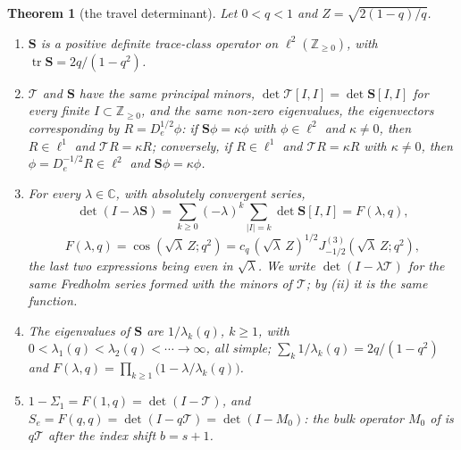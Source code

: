 \documentclass[11pt]{article}
\theoremstyle{plain}
\newtheorem{theorem}{Theorem}
\theoremstyle{definition}
\theoremstyle{remark}
\newcommand{\Z}{\mathbb{Z}}
\newcommand{\C}{\mathbb{C}}
\theoremstyle{plain}\newtheorem*{maintheorem}{Main Theorem}
\begin{document}
\begin{theorem}[the travel determinant]\label{thm:fredholm}
Let $0<q<1$ and $Z=\sqrt{2(1-q)/q}$.
\begin{enumerate}[label=\textup{(\roman*)},leftmargin=2.2em,itemsep=0.1em,topsep=0.2em]
\item $\mathbf S$ is a positive definite trace-class operator on $\ell^2(\Z_{\ge0})$, with
$\operatorname{tr}\mathbf S=2q/(1-q^2)$.
\item $\mathcal T$ and $\mathbf S$ have the same principal minors,
$\det\mathcal T[I,I]=\det\mathbf S[I,I]$ for every finite $I\subset\Z_{\ge0}$, and the same non-zero
eigenvalues, the eigenvectors corresponding by $R=D_e^{1/2}\phi$: if $\mathbf S\phi=\kappa\phi$ with
$\phi\in\ell^2$ and $\kappa\ne0$, then $R\in\ell^1$ and $\mathcal TR=\kappa R$; conversely, if
$R\in\ell^1$ and $\mathcal TR=\kappa R$ with $\kappa\ne0$, then $\phi=D_e^{-1/2}R\in\ell^2$ and
$\mathbf S\phi=\kappa\phi$.
\item For every $\lambda\in\C$, with absolutely convergent series,
\[
   \det(I-\lambda\mathbf S)=\sum_{k\ge0}(-\lambda)^k\!\!\sum_{|I|=k}\det\mathbf S[I,I]
   =F(\lambda,q),
\]
\[
   F(\lambda,q)=\cos(\sqrt\lambda\,Z;q^2)
   =c_q\,(\sqrt\lambda\,Z)^{1/2}J^{(3)}_{-1/2}(\sqrt\lambda\,Z;q^2),
\]
the last two expressions being even in $\sqrt\lambda$. We write $\det(I-\lambda\mathcal T)$ for the
same Fredholm series formed with the minors of $\mathcal T$; by \textup{(ii)} it is the same
function.
\item The eigenvalues of $\mathbf S$ are $1/\lambda_k(q)$, $k\ge1$, with
$0<\lambda_1(q)<\lambda_2(q)<\cdots\to\infty$, all simple; $\sum_k1/\lambda_k(q)=2q/(1-q^2)$ and
$F(\lambda,q)=\prod_{k\ge1}\bigl(1-\lambda/\lambda_k(q)\bigr)$.
\item $1-\Sigma_1=F(1,q)=\det(I-\mathcal T)$, and $S_e=F(q,q)=\det(I-q\mathcal T)=\det(I-M_0)$: the
bulk operator $M_0$ of {\cite[Definition ``section identity'', \textup{def:model}]{Bonfioli2026bB}} is $q\mathcal T$ after the index shift $b=s+1$.
\end{enumerate}
\end{theorem}
\end{document}
